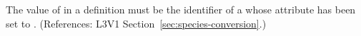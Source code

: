 The value of  in a \Species definition must be the
identifier of a \Parameter whose  attribute has been set to
.  (References: L3V1 Section~\ref{sec:species-conversion}.)